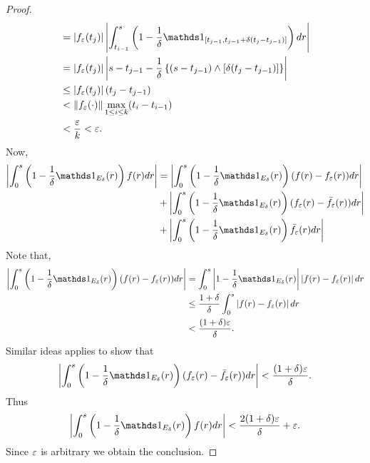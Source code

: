 \begin{proof}
\begin{align*}
            &= \abs{f_{\veps}(t_j)} \abs{\int_{t_{i-1}}^{s} \left(1 - %
                \frac{1}{\delta}\ind_{[t_{j-1}, t_{j-1}+ \delta(t_j - t_{j-1})]}\right)dr} \\
            &= \abs{f_{\veps}(t_j)} \abs{s-t_{j-1} - \dfrac{1}{\delta} \left\{%
                (s - t_{j-1}) \wedge [\delta(t_j - t_{j-1})]\right\} } \\
            &\leq  \abs{f_{\veps}(t_j)}(t_j - t_{j-1}) \\
            &< \norm{f_{\veps}(\cdot)} \max_{1\leq i \leq k}(t_i - t_{i-1}) \\
            &< \dfrac{\veps}{k} < \veps.
    \end{align*}
    Now,
    \begin{align*}
        \abs{\int_{0}^{s} \left(1 - \frac{1}{\delta} \ind_{E_{\delta}}(r) \right)f(r)dr} &= %
            \abs{\int_{0}^{s} \left(1 - \frac{1}{\delta} \ind_{E_{\delta}}(r) \right)(f(r) - f_{\veps}(r))dr} \\ %
            &+ \abs{\int_{0}^{s} \left(1 - \frac{1}{\delta} \ind_{E_{\delta}}(r) \right)(f_{\veps}(r) - \Bar{f}_{\veps}(r))dr} \\%
            &+ \abs{\int_{0}^{s} \left(1 - \frac{1}{\delta} \ind_{E_{\delta}}(r) \right) \Bar{f}_{\veps}(r)dr} %
    \end{align*}
    Note that,
    \begin{align*}
        \abs{\int_{0}^{s} \left(1 - \frac{1}{\delta} \ind_{E_{\delta}}(r) \right)%
        (f(r) - f_{\veps}(r))dr} %
        &= \int_{0}^{s} \abs{1 - \frac{1}{\delta} \ind_{E_{\delta}}(r)}\abs{f(r) - f_{\veps}(r)}dr \\
        &\leq \dfrac{1 +\delta}{\delta} \int_{0}^{s}\abs{f(r) - f_{\veps}(r)}dr \\
        &< \dfrac{(1+\delta)\veps}{\delta}.
    \end{align*}
    Similar ideas applies to show that 
    \begin{equation*}
        \abs{\int_{0}^{s} \left(1 - \frac{1}{\delta} \ind_{E_{\delta}}(r) \right)%
            (f_{\veps}(r) - \Bar{f}_{\veps}(r))dr}  < \dfrac{(1+\delta)\veps}{\delta}.
    \end{equation*}
    Thus
    \begin{equation*}
        \abs{\int_{0}^{s} \left(1 - \frac{1}{\delta} \ind_{E_{\delta}}(r) %
        \right)f(r)dr} < \dfrac{2(1+\delta)\veps}{\delta} + \veps.
    \end{equation*}
    Since $\varepsilon$ is arbitrary we obtain the conclusion.
\end{proof}

